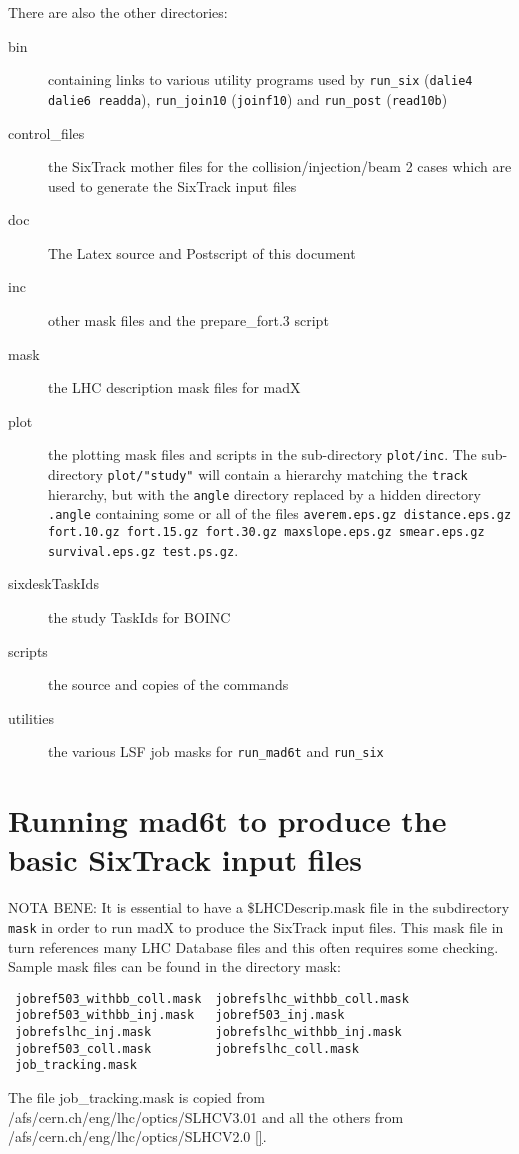 \documentclass{article}    %
\begin{document}
There are also the other directories:
\begin{description}
\item [bin] containing links to various utility programs used by {\tt run\_six}
({\tt dalie4 dalie6 readda}), {\tt run\_join10} ({\tt joinf10})
and {\tt run\_post} ({\tt read10b})
\item [control\_files] the SixTrack mother files for the collision/injection/beam 2
cases which are used to generate the SixTrack input files
\item [doc] The Latex source and Postscript of this document
\item [inc] other mask files and the prepare\_fort.3 script
\item [mask] the LHC description mask files for madX 
\item [plot] the plotting mask files and scripts in the sub-directory {\tt plot/inc}.
The sub-directory {\tt plot/"study"} will contain a hierarchy matching the {\tt track}
hierarchy, but with the {\tt angle} directory replaced by a hidden directory {\tt .angle}  
containing some or all of the files {\tt averem.eps.gz distance.eps.gz fort.10.gz 
fort.15.gz fort.30.gz maxslope.eps.gz smear.eps.gz survival.eps.gz test.ps.gz}.
\item [sixdeskTaskIds] the study TaskIds for BOINC
\item [scripts] the source and copies of the commands
\item [utilities] the various LSF job masks for {\tt run\_mad6t} and {\tt run\_six}  
\end{description}
\section{Running mad6t to produce the basic SixTrack input files}
\label{sec:mad_6t}
NOTA BENE: It is essential to have a \$LHCDescrip.mask file
in the subdirectory {\tt mask} in order to run madX to produce
the SixTrack input files. This mask file in turn references many
LHC Database files and this often requires some checking.
Sample mask files can be found in the directory mask:
\begin{verbatim}
 jobref503_withbb_coll.mask  jobrefslhc_withbb_coll.mask  
 jobref503_withbb_inj.mask   jobref503_inj.mask        
 jobrefslhc_inj.mask         jobrefslhc_withbb_inj.mask
 jobref503_coll.mask         jobrefslhc_coll.mask        
 job_tracking.mask
\end{verbatim}
The file job\_tracking.mask is copied from
/afs/cern.ch/eng/lhc/optics/SLHCV3.01 and all the
others from /afs/cern.ch/eng/lhc/optics/SLHCV2.0 \ref{}.
\end{document}
